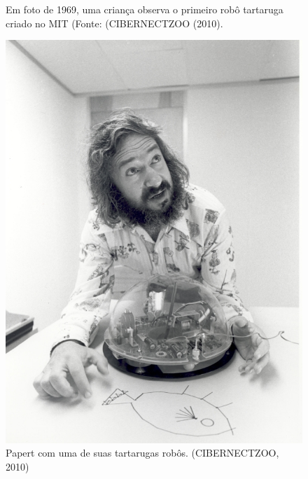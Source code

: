 \begin{figure}[htb]
\begin{minipage}[b]{0.4\linewidth}
                \caption{Em foto de 1969, uma criança observa o primeiro robô tartaruga criado no MIT (Fonte: (CIBERNECTZOO (2010).}
                \label{c2ca828982a83621e08977a23628db7b32a934d9}
\end{minipage}
\hspace{0.5cm}
\begin{minipage}[b]{0.4\linewidth}
        \centering
                \includegraphics[width=1.0\linewidth]{../../../imagens/Papert-x640.jpg}
                \caption{Papert com uma de suas tartarugas robôs. (CIBERNECTZOO, 2010)}
                \label{16372e5cf76e6860245131e51a3bf17c58dd1e46}
\end{minipage}%
\hspace{0.5cm}
\begin{minipage}[b]{0.4\linewidth}
        \centering

\end{minipage}
\end{figure}
